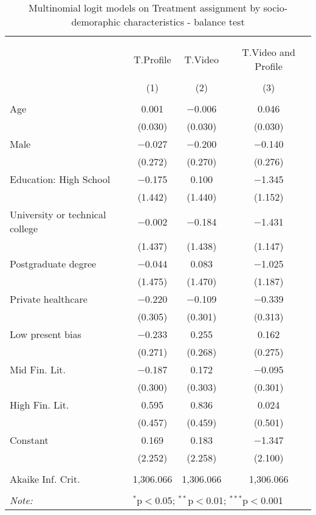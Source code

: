 
\begin{table}[H] \centering 
  \caption{Multinomial logit models on Treatment assignment by socio-demoraphic characteristics  - balance test} 
  \label{tbl:balance} 
\begin{tabular}{@{\extracolsep{5pt}}lccc} 
\\[-1.8ex]\hline 
\hline \\[-1.8ex] 
\\[-1.8ex] & T.Profile & T.Video & T.Video and Profile \\ 
\\[-1.8ex] & (1) & (2) & (3)\\ 
\hline \\[-1.8ex] 
 Age & 0.001 & $-$0.006 & 0.046 \\ 
  & (0.030) & (0.030) & (0.030) \\ 
  Male & $-$0.027 & $-$0.200 & $-$0.140 \\ 
  & (0.272) & (0.270) & (0.276) \\ 
  Education: High School & $-$0.175 & 0.100 & $-$1.345 \\ 
  & (1.442) & (1.440) & (1.152) \\ 
  University or technical college & $-$0.002 & $-$0.184 & $-$1.431 \\ 
  & (1.437) & (1.438) & (1.147) \\ 
  Postgraduate degree & $-$0.044 & 0.083 & $-$1.025 \\ 
  & (1.475) & (1.470) & (1.187) \\ 
  Private healthcare & $-$0.220 & $-$0.109 & $-$0.339 \\ 
  & (0.305) & (0.301) & (0.313) \\ 
  Low present bias & $-$0.233 & 0.255 & 0.162 \\ 
  & (0.271) & (0.268) & (0.275) \\ 
  Mid Fin. Lit. & $-$0.187 & 0.172 & $-$0.095 \\ 
  & (0.300) & (0.303) & (0.301) \\ 
  High Fin. Lit. & 0.595 & 0.836 & 0.024 \\ 
  & (0.457) & (0.459) & (0.501) \\ 
  Constant & 0.169 & 0.183 & $-$1.347 \\ 
  & (2.252) & (2.258) & (2.100) \\ 
 \hline \\[-1.8ex] 
Akaike Inf. Crit. & 1,306.066 & 1,306.066 & 1,306.066 \\ 
\hline 
\hline \\[-1.8ex] 
\textit{Note:}  & \multicolumn{3}{l}{$^{*}$p$<$0.05; $^{**}$p$<$0.01; $^{***}$p$<$0.001} \\ 
\end{tabular} 
\end{table} 
